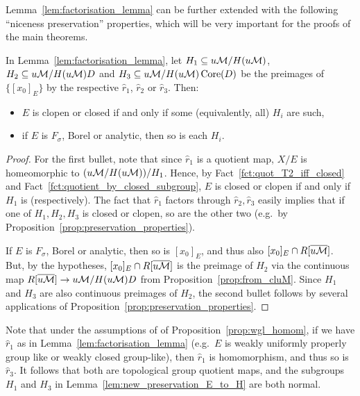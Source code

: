 	
	Lemma~\ref{lem:factorisation_lemma} can be further extended with the following ``niceness preservation'' properties, which will be very important for the proofs of the main theorems.
	\begin{lem}
		\label{lem:new_preservation_E_to_H}
		In Lemma~\ref{lem:factorisation_lemma}, let $H_1\subseteq u{\mathcal M}/H(u{\mathcal M})$, $H_2\subseteq u{\mathcal M}/H(u{\mathcal M})D$ and $H_3\subseteq u{\mathcal M}/H(u{\mathcal M})\operatorname{{Core}}(D)$ be the preimages of $\{[x_0]_E\}$ by the respective $\hat r_1$, $\hat r_2$ or $\hat r_3$. Then:
		\begin{itemize}
			\item
			$E$ is clopen or closed if and only if some (equivalently, all) $H_i$ are such,
			\item
			if $E$ is $F_\sigma$, Borel or analytic, then so is each $H_i$.
		\end{itemize}
	\end{lem}
	\begin{proof}
		For the first bullet, note that since $\hat r_1$ is a quotient map, $X/E$ is homeomorphic to $(u{\mathcal M}/H(u{\mathcal M}))/H_1$. Hence, by Fact~\ref{fct:quot_T2_iff_closed} and Fact~\ref{fct:quotient_by_closed_subgroup}, $E$ is closed or clopen if and only if $H_1$ is (respectively). The fact that $\hat r_1$ factors through $\hat r_2,\hat r_3$ easily implies that if one of $H_1,H_2,H_3$ is closed or clopen, so are the other two (e.g.\ by Proposition~\ref{prop:preservation_properties}).
		
		If $E$ is $F_\sigma$, Borel or analytic, then so is $[x_0]_E$, and thus also $[x_0]_E\cap R[\overline{u{\mathcal M}}]$. But, by the hypotheses, $[x_0]_E\cap R[\overline{u{\mathcal M}}]$ is the preimage of $H_2$ via the continuous map $R[\overline{u{\mathcal M}}]\to u{\mathcal M}/H(u{\mathcal M})D$ from Proposition~\ref{prop:from_cluM}. Since $H_1$ and $H_3$ are also continuous preimages of $H_2$, the second bullet follows by several applications of Proposition~\ref{prop:preservation_properties}.
	\end{proof}
	
	\begin{rem}
		\label{rem:homom_factor}
		Note that under the assumptions of of Proposition~\ref{prop:wgl_homom}, if we have $\hat r_1$ as in Lemma~\ref{lem:factorisation_lemma} (e.g.\ $E$ is weakly uniformly properly group like or weakly closed group-like), then $\hat r_1$ is  homomorphism, and thus so is $\hat r_3$. It follows that both are topological group quotient maps, and the subgroups $H_1$ and $H_3$ in Lemma~\ref{lem:new_preservation_E_to_H} are both normal.
		\xqed{\lozenge}
	\end{rem}
	
